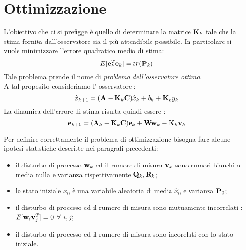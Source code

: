 \section{Ottimizzazione}
L'obiettivo che ci si prefigge è quello di determinare la matrice $\mathbf{K}_k$ tale che la stima fornita dall'osservatore sia il più attendibile possibile.
In particolare si vuole minimizzare l'errore quadratico medio di stima:
\[E[\mathbf{e}_k^T\mathbf{e}_k]=tr(\mathbf{P}_k)\]
Tale problema prende il nome di \textit{problema dell'osservatore ottimo}.
\\A tal proposito consideriamo l' osservatore : \[\hat{x}_{k+1} = (\mathbf{A}-\mathbf{K}_k\mathbf{C})\hat{x}_k+b_k+\mathbf{K}_k y_k\]
La dinamica dell'errore di stima risulta quindi essere : \[\mathbf{e}_{k+1} = (\mathbf{A}_k-\mathbf{K}_k\mathbf{C})\mathbf{e}_k+\mathbf{W}\mathbf{w}_k-\mathbf{K}_k \mathbf{v}_k\]

Per definire correttamente il problema di ottimizzazione bisogna fare alcune ipotesi statistiche descritte nei paragrafi precedenti: 
\begin{itemize}
\item il disturbo di processo $\mathbf{w}_k$ ed il rumore di misura $\mathbf{v}_k$ sono rumori bianchi a media nulla e varianza rispettivamente $\mathbf{Q}_k , \mathbf{R}_k$;
\item lo stato iniziale $x_0$ è una variabile aleatoria di media $\hat{x}_0$ e varianza $\mathbf{P}_0$;
\item il disturbo di processo ed il rumore di misura sono mutuamente incorrelati : $E[\mathbf{w}_i \mathbf{v}^T_j] = 0$  $\forall$ $ i,j$;
\item il disturbo di processo ed il rumore di misura sono incorelati con lo stato iniziale.
\end{itemize}

